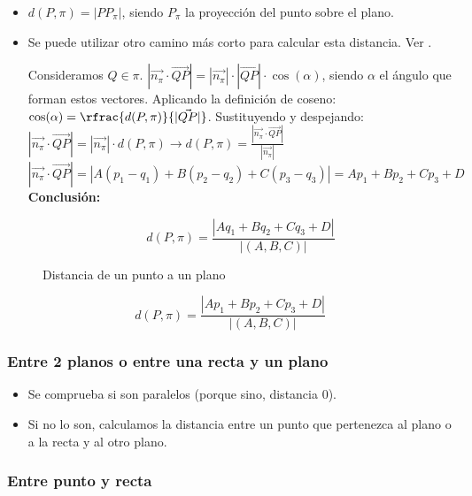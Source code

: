 \begin{itemize}
  \item $d(P,\pi) = |PP_{\pi}|$, siendo $P_{\pi}$ la proyección del punto sobre el plano.
  \item Se puede utilizar otro camino más corto para calcular esta distancia. Ver .

  \subitem Consideramos $Q\in\pi$.
  \subitem $|\vec{n_{\pi}}·\vec{QP}| = |\vec{n_{\pi}}|·|\vec{QP}|·\cos(\alpha)$, siendo $\alpha$ el ángulo que forman estos vectores.
  \subitem Aplicando la definición de coseno: $\cos(\alpha) = \rfrac{d(P,\pi)}{|\vec{QP}|}$.
  \subitem Sustituyendo y despejando: $|\vec{n_{\pi}}·\vec{QP}| = |\vec{n_{\pi}}|·d(P,\pi) \to d(P,\pi) = \frac{|\vec{n_{\pi}}·\vec{QP}|}{|\vec{n_{\pi}}|}$
  \subitem $|\vec{n_{\pi}}·\vec{QP}| = |A(p_1-q_1) + B(p_2-q_2) + C(p_3-q_3)| = Ap_1+Bp_2+Cp_3+D$
  \subitem \textbf{Conclusión:}

  \[
    d(P,\pi) = \frac{|Aq_1+Bq_2+Cq_3+D|}{|(A,B,C)|}
  \]
\end{itemize}

\begin{figure}[hbtp]
\centering
{}

\label{fig::dist-punto-plano}
\caption{Distancia de un punto a un plano}
\end{figure}

\[d(P,\pi) = \frac{|Ap_1+Bp_2+Cp_3+D|}{|(A,B,C)|}\]

\subsubsection{Entre 2 planos o entre una recta y un plano}

\begin{itemize}
  \item Se comprueba si son paralelos (porque sino, distancia 0).
  \item Si no lo son, calculamos la distancia entre un punto que pertenezca al plano o a la recta y al otro plano.
\end{itemize}

\subsubsection{Entre punto y recta}

